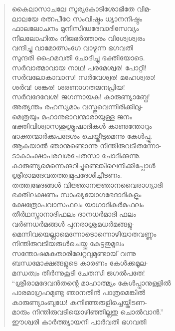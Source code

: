 \begin{verse}
കൈലാസാചലേ സൂര്യകോടിശോഭിതേ വിമ-\\
ലാലയേ രത്നപീഠേ സംവിഷ്ടം ധ്യാനനിഷ്ഠം\\
ഫാലലോചനം മുനിസിദ്ധദേവാദിസേവ്യം\\
നീലലോഹിതം നിജഭര്‍ത്താരം വിശ്വേശ്വരം\\
വന്ദിച്ചു വാമോത്സംഗേ വാഴുന്ന ഭഗവതി\\
സുന്ദരി ഹൈമവതി ചോദിച്ചു ഭക്തിയോടെ.\\
സര്‍വാത്മാവായ നാഥ! പരമേശ്വര! പോറ്റീ!\\
സര്‍വലോകാവാസ! സര്‍വേശ്വര! മഹേശ്വരാ!\\
ശര്‍വ! ശങ്കര! ശരണാഗതജനപ്രിയ!\\
സര്‍വദേവേശ! ജഗന്നായക! കാരുണ്യാബ്ധേ!\\
അത്യന്തം രഹസ്യമാം വസ്തുവെന്നിരിക്കിലു-\\
മെത്രയും മഹാനുഭാവന്മാരായുള്ള ജനം\\
ഭക്തിവിശ്വാസശുശ്രൂഷാദികള്‍ കാണുന്തോറും\\
ഭാക്തന്മാര്‍ക്കുപദേശം ചെയ്തീടുമെന്നു കേള്‍പ്പൂ.\\
ആകയാല്‍ ഞാനുണ്ടൊന്നു നിന്തിരുവടിതന്നോ-\\
ടാകാംക്ഷാപരവശചേതസാ ചോദിക്കുന്നു.\\
കാരുണ്യമെന്നെക്കുറിച്ചുണ്ടെങ്കിലെനിക്കിപ്പോള്‍\\
ശ്രീരാമദേവതത്ത്വമുപദേശിച്ചീടണം.\\
തത്ത്വഭേദങ്ങള്‍ വിജ്ഞാനജ്ഞാനവൈരാഗ്യാദി\\
ഭക്തിലക്ഷണം സാംഖ്യയോഗഭേദാദികളും\\
ക്ഷേത്രോപവാസഫലം യാഗാദികര്‍മഫലം\\
തീര്‍ഥസ്നാനാദിഫലം ദാനധര്‍മാദി ഫലം\\
വര്‍ണധര്‍മങ്ങള്‍ പുനരാശ്രമധര്‍മങ്ങളു-\\
മെന്നിവയെല്ലാമെന്നോടൊന്നൊഴിയാതവണ്ണം\\
നിന്തിരുവടിയരുള്‍ചെയ്തു കേട്ടതുമൂലം\\
സന്തോഷമകതാരിലേറ്റവുമുണ്ടായ് വന്നു\\
ബന്ധമോക്ഷങ്ങളുടെ കാരണം കേള്‍ക്കമൂല-\\
മന്ധത്വം തീര്‍ന്നുകൂടി ചേതസി ജഗല്‍പതേ!\\
“ശ്രീരാമദേവന്‍തന്റെ മാഹാത്മ്യം കേള്‍പ്പാനുള്ളില്‍\\
പാരമാഗ്രഹമുണ്ടു ഞാനതിന്‍ പാത്രമെങ്കില്‍\\
കാരുണ്യാംബുധേ! കനിഞ്ഞരുളിച്ചെയ്തീടണ-\\
മാരും നിന്തിരുവടിയൊഴിഞ്ഞില്ലതു ചൊല്‍വാന്‍.”\\
ഈശ്വരി കാര്‍ത്ത്യായനി പാര്‍വതി ഭഗവതി\\

\end{verse}
